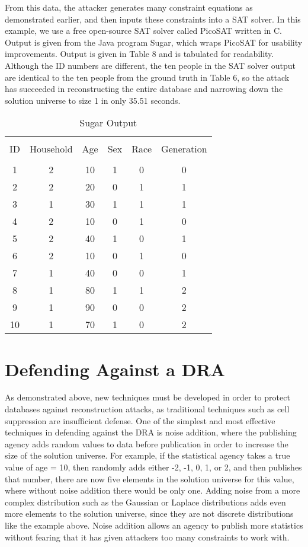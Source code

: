 \documentclass[jou,apacite]{apa6}
\begin{document}
From this data, the attacker generates many constraint equations as demonstrated earlier,
and then inputs these constraints into a SAT solver. In this example, we use a free open-source SAT solver
called PicoSAT written in C. Output is given from the Java program Sugar, which wraps PicoSAT for usability improvements. Output is given in Table 8 and is tabulated for readability. Although the ID numbers are different, the ten people in the SAT solver output are identical to the ten people from the ground truth in Table 6, so the attack has succeeded in reconstructing the entire database and narrowing down the solution universe to size 1 in only 35.51 seconds.

\begin{table}[b]
\caption{Sugar Output}\label{tab8}
\begin{tabular}{c|c|c|c|c|c}
\hline\\[-1.5ex]
ID & Household & Age & Sex & Race & Generation \\[0.5ex]
\hline\\[-1.5ex]
1 & 2 & 10 & 1 & 0 & 0  \\[0.5ex]
2 & 2 & 20 & 0 & 1 & 1  \\[0.5ex]
3 & 1 & 30 & 1 & 1 & 1  \\[0.5ex]
4 & 2 & 10 & 0 & 1 & 0  \\[0.5ex]
5 & 2 & 40 & 1 & 0 & 1  \\[0.5ex]
6 & 2 & 10 & 0 & 1 & 0  \\[0.5ex]
7 & 1 & 40 & 0 & 0 & 1  \\[0.5ex]
8 & 1 & 80 & 1 & 1 & 2  \\[0.5ex]
9 & 1 & 90 & 0 & 0 & 2 \\[0.5ex]
10 & 1 & 70 & 1 & 0 & 2 \\[0.5ex]
\hline
\end{tabular}
\end{table}

\pagebreak

\section{Defending Against a DRA}
As demonstrated above, new techniques must be developed in
order to protect databases against reconstruction attacks, as traditional techniques such as cell suppression are insufficient defense. One of the simplest and most effective techniques in defending against the DRA is noise addition, where the publishing agency adds random values to data before publication in order to increase the size of the solution universe. For example, if the statistical agency takes a true value of age = 10, then randomly adds either -2, -1, 0, 1, or 2, and then publishes that number, there are now five elements in the solution universe for this value, where without noise addition there would be only one. Adding noise from a more complex distribution such as the Gaussian or Laplace distributions adds even more elements to the solution universe, since they are not discrete distributions like the example above. Noise addition allows an agency to publish more statistics without fearing that it has given attackers too many constraints to work with.
\end{document}
